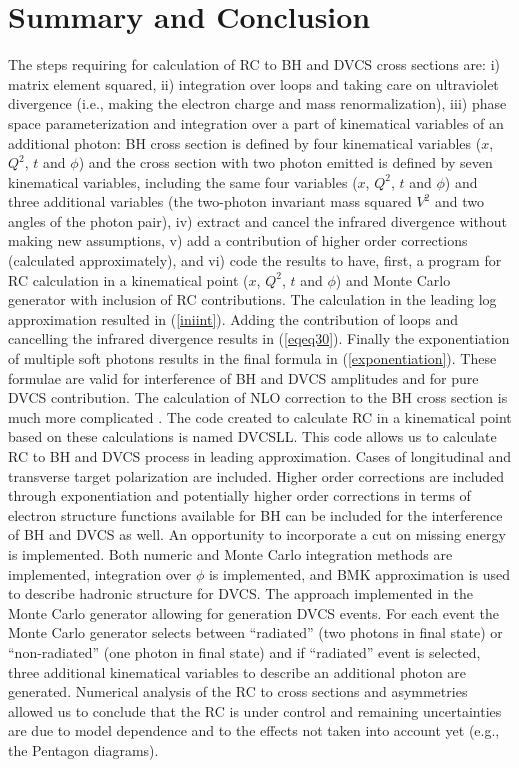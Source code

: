 \documentclass[aps,prd,reprint,groupedaddress,preprintnumbers,showpacs]{revtex4-1}
\begin{document}
\section{Summary and Conclusion} 
\label{SectDiscussion}
The steps requiring for calculation of RC to BH and DVCS cross sections are: i) matrix element squared, ii) integration over loops and taking care on ultraviolet divergence (i.e., making the electron charge and mass renormalization), iii) phase space parameterization and integration over a part of kinematical variables of an additional photon: BH cross section is defined by four kinematical variables ($x$, $Q^2$, $t$ and $\phi$) and the cross section with two photon emitted is defined by seven kinematical variables, including the same 
four variables ($x$, $Q^2$, $t$ and $\phi$) and three additional variables (the two-photon invariant mass squared $ V^2$ and two angles of the photon pair), iv) 
extract and cancel the infrared divergence without making new assumptions, v) add a contribution of higher order corrections (calculated approximately), and vi) code the results to have, first, a program for RC calculation in a kinematical point ($x$, $Q^2$, $t$ and $\phi$) and Monte Carlo generator with inclusion of RC contributions. The calculation in the leading log approximation resulted in (\ref{iniint}). Adding the contribution of loops and cancelling the infrared divergence results in (\ref{eqeq30}). Finally the exponentiation of multiple soft photons results in the final formula in (\ref{exponentiation}). These formulae are valid for interference of BH and DVCS amplitudes and for pure DVCS contribution. The calculation of NLO correction to the BH cross section is much more complicated 
\cite{AISh2014}. The code created to calculate RC in a kinematical point based on these calculations is named DVCSLL. This code allows us to calculate RC to BH and DVCS process in leading approximation. Cases of longitudinal and transverse target polarization are included. Higher order corrections are included through exponentiation and potentially higher order corrections in terms of electron structure functions available for BH can be included for the interference of BH and DVCS as well. An opportunity to incorporate a cut on missing energy is implemented. Both numeric and Monte Carlo integration methods are implemented, integration over $\phi$ is implemented, and BMK approximation \cite{BKM2002} is used to describe hadronic structure for DVCS. The approach implemented in the Monte Carlo generator allowing for generation DVCS events. For each event the Monte Carlo generator selects between ``radiated'' (two photons in final state) or ``non-radiated'' (one photon in final state) and if ``radiated'' event is selected,   
three additional kinematical variables to describe an additional photon  are generated.
Numerical analysis of the RC to cross sections and asymmetries allowed us to conclude that the RC is under control and remaining uncertainties are due to model dependence and to the effects not taken into account yet (e.g., the Pentagon diagrams).  
\end{document}
